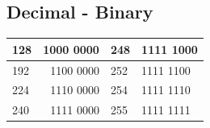 \documentclass{article}
\begin{document}
\subsection{Decimal - Binary}

\begin{table}[!h]
	\centering
	\begin{tabular}{|l|r|l|l|}
		\hline
		128 & \multicolumn{1}{l|}{1000 0000} & 248 & 1111 1000 \\ \hline
		192 & 1100 0000                      & 252 & 1111 1100 \\ \hline
		224 & 1110 0000                      & 254 & 1111 1110 \\ \hline
		240 & 1111 0000                      & 255 & 1111 1111 \\ \hline
	\end{tabular}
\end{table}

\newpage
\end{document}
